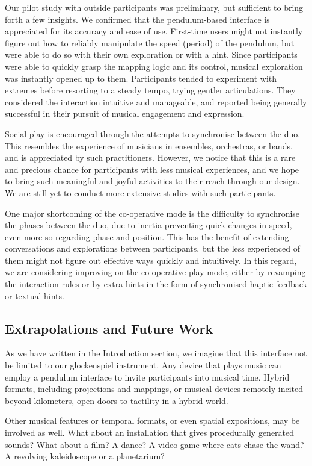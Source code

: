 \documentclass{nime-alternate} %
\begin{document}
Our pilot study with outside participants was preliminary, but sufficient to bring forth a few insights. We confirmed that the pendulum-based interface is appreciated for its accuracy and ease of use. First-time users might not instantly figure out how to reliably manipulate the speed (period) of the pendulum, but were able to do so with their own exploration or with a hint. Since participants were able to quickly grasp the mapping logic and its control, musical exploration was instantly opened up to them. Participants tended to experiment with extremes before resorting to a steady tempo, trying gentler articulations. They considered the interaction intuitive and manageable, and reported being generally successful in their pursuit of musical engagement and expression.

Social play is encouraged through the attempts to synchronise between the duo. This resembles the experience of musicians in ensembles, orchestras, or bands, and is appreciated by such practitioners. However, we notice that this is a rare and precious chance for participants with less musical experiences, and we hope to bring such meaningful and joyful activities to their reach through our design. We are still yet to conduct more extensive studies with such participants.

One major shortcoming of the co-operative mode is the difficulty to synchronise the phases between the duo, due to inertia preventing quick changes in speed, even more so regarding phase and position. This has the benefit of extending conversations and explorations between participants, but the less experienced of them might not figure out effective ways quickly and intuitively. In this regard, we are considering improving on the co-operative play mode, either by revamping the interaction rules or by extra hints in the form of synchronised haptic feedback or textual hints.

\subsection{Extrapolations and Future Work}
As we have written in the Introduction section, we imagine that this interface not be limited to our glockenspiel instrument. Any device that plays music can employ a pendulum interface to invite participants into musical time. Hybrid formats, including projections and mappings, or musical devices remotely incited beyond kilometers, open doors to tactility in a hybrid world.

Other musical features or temporal formats, or even spatial expositions, may be involved as well. What about an installation that gives procedurally generated sounds? What about a film? A dance? A video game where cats chase the wand? A revolving kaleidoscope or a planetarium?
\end{document}
